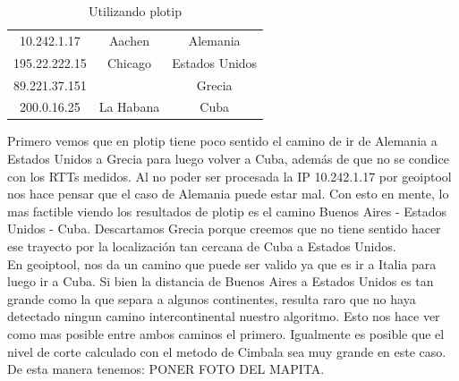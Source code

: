 \begin{table}
\centering
\begin{tabular}{|c|c|c|}
10.242.1.17 & Aachen & Alemania \\
195.22.222.15 & Chicago & Estados Unidos  \\
89.221.37.151 &  & Grecia \\
200.0.16.25 & La Habana & Cuba \\
\end{tabular}
\caption{Utilizando plotip}
\end{table}

Primero vemos que en plotip tiene poco sentido el camino de ir de Alemania a Estados Unidos a Grecia para luego volver a Cuba, adem\'as de que no se condice con los RTTs medidos. Al no poder ser procesada la IP 10.242.1.17 por geoiptool nos hace pensar que el caso de Alemania puede estar mal. Con esto en mente, lo mas factible viendo los resultados de plotip es el camino Buenos Aires - Estados Unidos - Cuba. Descartamos Grecia porque creemos que no tiene sentido hacer ese trayecto por la localizaci\'on tan cercana de Cuba a Estados Unidos.\\

En geoiptool, nos da un camino que puede ser valido ya que es ir a Italia para luego ir a Cuba. Si bien la distancia de Buenos Aires a Estados Unidos es tan grande como la que separa a algunos continentes, resulta raro que no haya detectado ningun camino intercontinental nuestro algoritmo. Esto nos hace ver como mas posible entre ambos caminos el primero. Igualmente es posible que el nivel de corte calculado con el metodo de Cimbala sea muy grande en este caso.\\

De esta manera tenemos: PONER FOTO DEL MAPITA.
